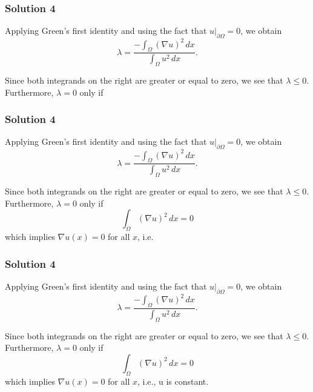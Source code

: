 \documentclass[10pt, t, allowdisplaybreaks]{beamer}
\newcommand{\at}[3]{\left.#1\right\vert_{#2}^{#3}}
\begin{document}
\begin{frame}
    \frametitle{Solution 4}
    \par Applying Green's first identity and using the fact that $\at{u}{\partial \Omega}{} = 0$, we obtain
    \begin{equation*}
        \lambda = \frac{-\int_\Omega (\nabla u)^2\,dx}{\int_\Omega u^2\,dx}.
    \end{equation*}

    \par Since both integrands on the right are greater or equal to zero, we see that $\lambda\leq 0$. Furthermore, $\lambda = 0$ only if 
\end{frame}
\begin{frame}
    \frametitle{Solution 4}
    \par Applying Green's first identity and using the fact that $\at{u}{\partial \Omega}{} = 0$, we obtain
    \begin{equation*}
        \lambda = \frac{-\int_\Omega (\nabla u)^2\,dx}{\int_\Omega u^2\,dx}.
    \end{equation*}

    \par Since both integrands on the right are greater or equal to zero, we see that $\lambda\leq 0$. Furthermore, $\lambda = 0$ only if 
    \begin{equation*}
        \int_\Omega(\nabla u)^2\,dx = 0
    \end{equation*}
    which implies $\nabla u(x) = 0$ for all $x$, i.e.
\end{frame}
\begin{frame}
    \frametitle{Solution 4}
    \par Applying Green's first identity and using the fact that $\at{u}{\partial \Omega}{} = 0$, we obtain
    \begin{equation*}
        \lambda = \frac{-\int_\Omega (\nabla u)^2\,dx}{\int_\Omega u^2\,dx}.
    \end{equation*}

    \par Since both integrands on the right are greater or equal to zero, we see that $\lambda\leq 0$. Furthermore, $\lambda = 0$ only if 
    \begin{equation*}
        \int_\Omega(\nabla u)^2\,dx = 0
    \end{equation*}
    which implies $\nabla u(x) = 0$ for all $x$, i.e., u is constant.
\end{frame}
\end{document}
